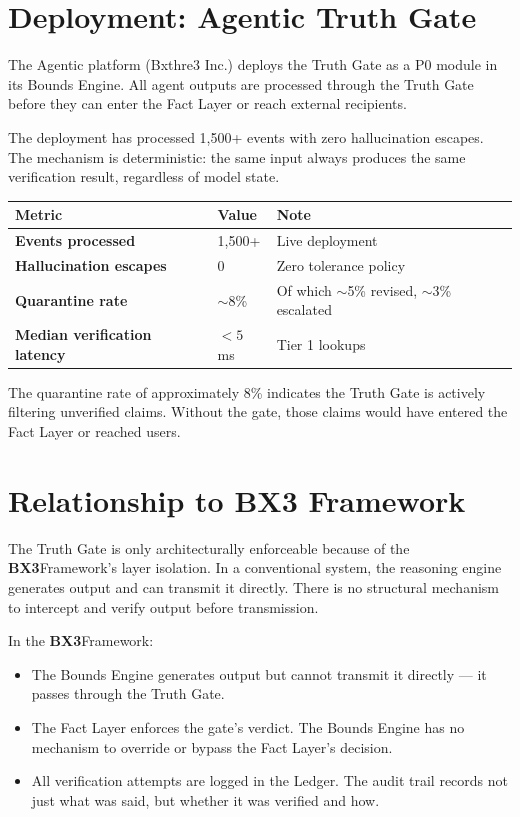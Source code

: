 \documentclass[12pt]{article}
\newcommand{\bxthree}{\textbf{BX3}}
\begin{document}
\section{Deployment: Agentic Truth Gate}
\label{sec:deployment}

The Agentic platform (Bxthre3 Inc.) deploys the Truth Gate as a P0 module in its Bounds Engine. All agent outputs are processed through the Truth Gate before they can enter the Fact Layer or reach external recipients.

The deployment has processed 1,500+ events with zero hallucination escapes. The mechanism is deterministic: the same input always produces the same verification result, regardless of model state.

\begin{center}
\begin{tabular}{>{\bfseries}p{4cm} p{3cm} p{3cm}}
\toprule
\textbf{Metric} & \textbf{Value} & \textbf{Note} \\
\midrule
Events processed & 1,500+ & Live deployment \\
Hallucination escapes & 0 & Zero tolerance policy \\
Quarantine rate & $\sim$8\% & Of which $\sim$5\% revised, $\sim$3\% escalated \\
Median verification latency & $<5$\,ms & Tier 1 lookups \\
\bottomrule
\end{tabular}
\end{center}

The quarantine rate of approximately 8\% indicates the Truth Gate is actively filtering unverified claims. Without the gate, those claims would have entered the Fact Layer or reached users.

\section{Relationship to BX3 Framework}
\label{sec:relationship}

The Truth Gate is only architecturally enforceable because of the \bxthree Framework's layer isolation. In a conventional system, the reasoning engine generates output and can transmit it directly. There is no structural mechanism to intercept and verify output before transmission.

In the \bxthree Framework:

\begin{itemize}[noitemsep]
    \item The Bounds Engine generates output but cannot transmit it directly --- it passes through the Truth Gate.
    \item The Fact Layer enforces the gate's verdict. The Bounds Engine has no mechanism to override or bypass the Fact Layer's decision.
    \item All verification attempts are logged in the Ledger. The audit trail records not just what was said, but whether it was verified and how.
\end{itemize}
\end{document}
